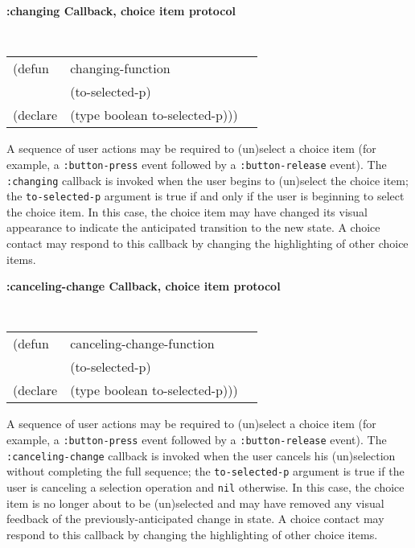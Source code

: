 {\samepage
{\large {\bf :changing \hfill Callback, choice item protocol}} 
\begin{flushright} 
\parbox[t]{6.125in}{
\tt
\begin{tabular}{lll}
\raggedright
(defun & changing-function \\
 & (to-selected-p) \\
(declare & (type boolean to-selected-p)))
\end{tabular}
\rm

}\end{flushright}}

\begin{flushright} \parbox[t]{6.125in}{ A sequence of user actions may be
required to (un)select a choice item (for example, a {\tt :button-press} event
followed by a {\tt :button-release} event).  The {\tt :changing} callback is
invoked when the user begins to (un)select the choice item; the {\tt to-selected-p}
argument is true if and only if the user is beginning to select the choice item.
In this case, the choice item may have changed its visual
appearance to indicate the anticipated transition to the new state.  A choice
contact may respond to this callback by changing the highlighting of other
choice items.

}\end{flushright}


{\samepage
{\large {\bf :canceling-change \hfill Callback, choice item protocol}} 
\begin{flushright} 
\parbox[t]{6.125in}{
\tt
\begin{tabular}{lll}
\raggedright
(defun & canceling-change-function \\
 & (to-selected-p) \\
(declare & (type boolean to-selected-p)))
\end{tabular}
\rm

}\end{flushright}}

\begin{flushright} \parbox[t]{6.125in}{ A sequence of user actions may be
required
to (un)select a choice item (for example, a {\tt :button-press} event followed
by a {\tt :button-release} event).  The {\tt :canceling-change} callback is
invoked when the user cancels his (un)selection without completing the full
sequence; the {\tt to-selected-p}
argument is true if the user is canceling a selection operation and {\tt nil}
otherwise. In this case, the choice item is no longer about to be (un)selected
and may have removed any visual feedback of the previously-anticipated change in
state.  A choice contact may respond to this callback by changing the
highlighting of other choice items.

}\end{flushright}

